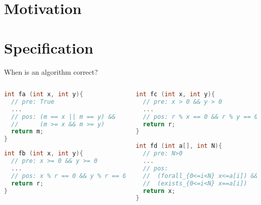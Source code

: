 \documentclass[aspectratio=169]{beamer}
\begin{document}
\frame[plain]{\titlepage}


\section{Motivation}


\section{Specification}

\begin{frame}[fragile]{When is an algorithm correct?}
~\\[-8mm]
\begin{columns}
\begin{column}{0.48\textwidth}
\begin{lstlisting}[language=C++]
int fa (int x, int y){
  // pre: True
  ...
  // pos: (m == x || m == y) &&
  //      (m >= x && m >= y)
  return m;
}
\end{lstlisting}
\begin{lstlisting}[language=C++]
int fb (int x, int y){
  // pre: x >= 0 && y >= 0
  ...
  // pos: x % r == 0 && y % r == 0
  return r;
}
\end{lstlisting}
\end{column}
\begin{column}{0.48\textwidth}
\begin{lstlisting}[language=C++]
int fc (int x, int y){
  // pre: x > 0 && y > 0
  ...
  // pos: r % x == 0 && r % y == 0
  return r;
}
\end{lstlisting}
\begin{lstlisting}[language=C++]
int fd (int a[], int N){
  // pre: N>0
  ...
  // pos:
  //  (forall_{0<=i<N} x<=a[i]) &&
  //  (exists_{0<=i<N} x==a[i])
  return x;
}
\end{lstlisting}
\end{column}
\end{columns}
\end{frame}


\end{document}
